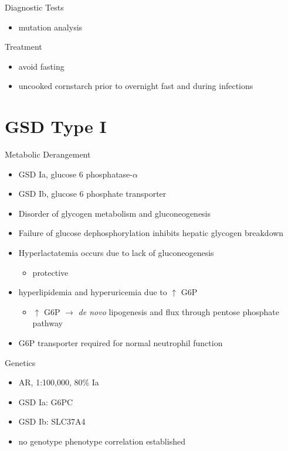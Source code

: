 \documentclass[presentation, smaller]{beamer}
\begin{document}
\begin{frame}[label={sec:orgadefdd5}]{Diagnostic Tests}
\begin{itemize}
\item mutation analysis
\end{itemize}
\end{frame}
\begin{frame}[label={sec:org89a6fd1}]{Treatment}
\begin{itemize}
\item avoid fasting
\item uncooked cornstarch prior to overnight fast and during infections
\end{itemize}
\end{frame}
\section{GSD Type I}
\label{sec:org3f5a745}
\begin{frame}[label={sec:org66cc3d1}]{Metabolic Derangement}
\begin{itemize}
\item GSD Ia, glucose 6 phosphatase-\(\alpha\)
\item GSD Ib, glucose 6 phosphate transporter
\item Disorder of glycogen metabolism and gluconeogenesis
\item Failure of glucose dephosphorylation inhibits hepatic glycogen breakdown
\item Hyperlactatemia occurs due to lack of gluconeogenesis
\begin{itemize}
\item protective
\end{itemize}
\item hyperlipidemia and hyperuricemia due to \(\uparrow\) G6P
\begin{itemize}
\item \(\uparrow\) G6P \(\to\) \emph{de novo} lipogenesis and flux through pentose phosphate pathway
\end{itemize}
\item G6P transporter required for normal neutrophil function
\end{itemize}
\end{frame}

\begin{frame}[label={sec:org0c8bf3e}]{Genetics}
\begin{itemize}
\item AR, 1:100,000, 80\% Ia
\item GSD Ia: G6PC
\item GSD Ib: SLC37A4
\item no genotype phenotype correlation established
\end{itemize}
\end{frame}
\end{document}
